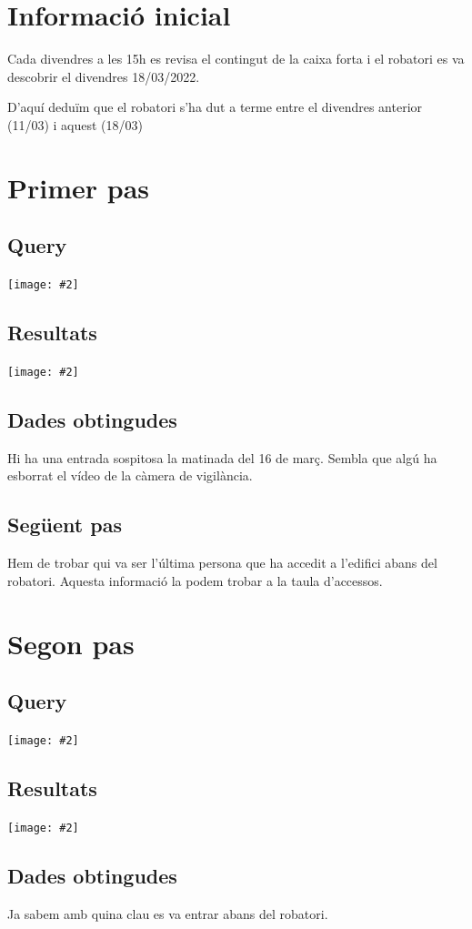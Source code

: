 \documentclass[a4paper,12pt]{article}
\newcommand{\mygraphic}[2][width=\textwidth]{\begin{center}
		\centering\texttt{[image: \#2]}\par
\end{center}}
\begin{document}

\tableofcontents

\newpage
\section{Informació inicial}
Cada divendres a les 15h es revisa el contingut de la caixa forta i el robatori es va descobrir el divendres 18/03/2022.

D'aquí deduïm que el robatori s'ha dut a terme entre el divendres anterior (11/03) i aquest (18/03)

\newpage
\section{Primer pas}
\subsection{Query}
\mygraphic{imatges/1a.png}
\subsection{Resultats}
\mygraphic{imatges/1b.png}
\subsection{Dades obtingudes}
Hi ha una entrada sospitosa la matinada del 16 de març. Sembla que algú ha esborrat el vídeo de la càmera de vigilància.
\subsection{Següent pas}
Hem de trobar qui va ser l'última persona que ha accedit a l'edifici abans del robatori. Aquesta informació la podem trobar a la taula d'accessos.

\newpage
\section{Segon pas}
\subsection{Query}
\mygraphic{imatges/2a.png}
\subsection{Resultats}
\mygraphic{imatges/2b.png}
\subsection{Dades obtingudes}
Ja sabem amb quina clau es va entrar abans del robatori.
\end{document}
